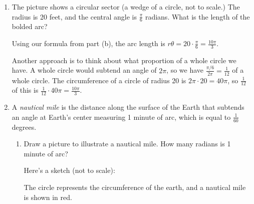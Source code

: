 \documentclass[main]{subfiles}
\begin{document}
\begin{enumerate}[resume]
  
  \item
  \begin{problem}
    The picture shows a circular sector (a wedge of a circle, not to scale.)  The radius is 20 feet, and the central angle is $\frac{\pi}{6}$ radians. What is the length of the bolded arc? 

  \end{problem}

  \begin{solution}
    Using our formula from part (b), the arc length is $r\theta=20\cdot
    \frac{\pi}{6}=\boxed{\frac{10\pi}{3}}$.
    
    Another approach is to think about what proportion of
    a whole circle we have.  A whole circle would subtend an angle of $2
    \pi$, so we have $\frac{\pi/6}{2 \pi} = \frac{1}{12}$ of a whole
    circle.  The circumference of a circle of radius 20 is $2 \pi \cdot 20
    = 40 \pi$, so $\frac{1}{12}$ of this is $\frac{1}{12} \cdot 40 \pi =
    \boxed{ \frac{10 \pi}{3}}$.     
  \end{solution}


\item  A \emph{nautical mile} is the distance along the surface of the Earth
  that subtends an angle at Earth's center measuring 1 minute of arc, which is equal to $\frac{1}{60}$ degrees.
  \begin{enumerate}
  \item
    \begin{problem}[\vfill]
      Draw a picture to illustrate a nautical mile. How many radians is 1 minute of arc?
    \end{problem}

    \begin{solution}
      Here's a sketch (not to scale):
      \begin{center}
      \end{center}
      The circle represents the circumference of the earth, and a nautical
      mile is shown in red.


\end{solution}
\end{enumerate}
\end{enumerate}
\end{document}
